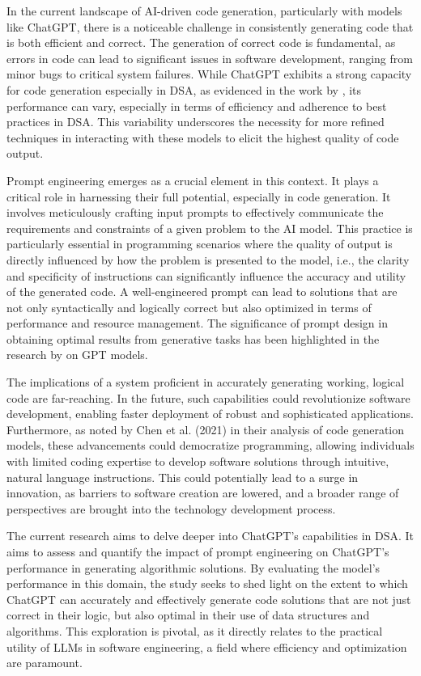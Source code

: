 In the current landscape of AI-driven code generation, particularly with models like ChatGPT, there is a noticeable challenge in consistently generating code that is both efficient and correct. The generation of correct code is fundamental, as errors in code can lead to significant issues in software development, ranging from minor bugs to critical system failures. While ChatGPT exhibits a strong capacity for code generation especially in DSA, as evidenced in the work by \cite{arefin2023unmasking}, its performance can vary, especially in terms of efficiency and adherence to best practices in DSA. This variability underscores the necessity for more refined techniques in interacting with these models to elicit the highest quality of code output.

Prompt engineering emerges as a crucial element in this context. It plays a critical role in harnessing their full potential, especially in code generation. It involves meticulously crafting input prompts to effectively communicate the requirements and constraints of a given problem to the AI model. This practice is particularly essential in programming scenarios where the quality of output is directly influenced by how the problem is presented to the model, i.e., the clarity and specificity of instructions can significantly influence the accuracy and utility of the generated code. A well-engineered prompt can lead to solutions that are not only syntactically and logically correct but also optimized in terms of performance and resource management. The significance of prompt design in obtaining optimal results from generative tasks has been highlighted in the research by \cite{chen2021evaluating} on GPT models.

The implications of a system proficient in accurately generating working, logical code are far-reaching. In the future, such capabilities could revolutionize software development, enabling faster deployment of robust and sophisticated applications. Furthermore, as noted by Chen et al. (2021) in their analysis of code generation models, these advancements could democratize programming, allowing individuals with limited coding expertise to develop software solutions through intuitive, natural language instructions. This could potentially lead to a surge in innovation, as barriers to software creation are lowered, and a broader range of perspectives are brought into the technology development process.

The current research aims to delve deeper into ChatGPT’s capabilities in DSA. It aims to assess and quantify the impact of prompt engineering on ChatGPT’s performance in generating algorithmic solutions. By evaluating the model’s performance in this domain, the study seeks to shed light on the extent to which ChatGPT can accurately and effectively generate code solutions that are not just correct in their logic, but also optimal in their use of data structures and algorithms. This exploration is pivotal, as it directly relates to the practical utility of LLMs in software engineering, a field where efficiency and optimization are paramount.




